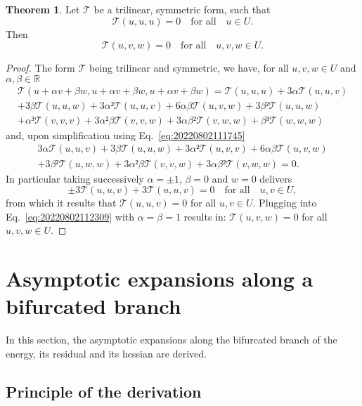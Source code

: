 \documentclass[12pt, final]{scrartcl}
\theoremstyle{definition}
\newtheorem{theorem}{Theorem}
\begin{document}
\begin{theorem}
  \label{thr:20220802112835}
  Let $𝒯$ be a trilinear, symmetric form, such that
  \begin{equation}
    \label{eq:20220802111745}
    𝒯(u, u, u) = 0 \quad \text{for all} \quad u \in U.
  \end{equation}
  Then
  \begin{equation}
    𝒯(u, v, w) = 0 \quad \text{for all} \quad u, v, w \in U.
  \end{equation}
\end{theorem}
\begin{proof}
  The form $𝒯$ being trilinear and symmetric, we have, for all $u, v, w \in U$
  and $α, β \in ℝ$
  \begin{multline*}
    𝒯(u + αv + βw, u + αv + βw, u + αv + βw) = 𝒯(u, u, u) + 3α 𝒯(u, u, v)\\
    + 3β 𝒯(u, u, w) + 3α² 𝒯(u, u, v) + 6 α β 𝒯(u, v, w) + 3 β² 𝒯(u, u, w)\\
    + α³ 𝒯(v, v, v) + 3 α² β 𝒯(v, v, w) + 3 α β² 𝒯(v, w, w) + β³ 𝒯(w, w, w)
  \end{multline*}
  and, upon simplification using Eq.~\eqref{eq:20220802111745}
  \begin{multline}
    \label{eq:20220802112309}
    3α 𝒯(u, u, v) + 3β 𝒯(u, u, w) + 3α² 𝒯(u, v, v) + 6 α β 𝒯(u, v, w)\\
    + 3 β² 𝒯(u, w, w) + 3 α² β 𝒯(v, v, w) + 3 α β² 𝒯(v, w, w) = 0.
  \end{multline}
  In particular taking successively $α = ±1$, $β = 0$ and $w = 0$ delivers
  \begin{equation*}
    ±3 𝒯(u, u, v) + 3 𝒯(u, u, v) = 0 \quad \text{for all} \quad u, v \in U,
  \end{equation*}
  from which it results that $𝒯(u, u, v) = 0$ for all $u, v \in U$. Plugging
  into Eq.~\eqref{eq:20220802112309} with $α = β = 1$ results in:
  $𝒯(u, v, w) = 0$ for all $u, v, w \in U$.
\end{proof}

\section{Asymptotic expansions along a bifurcated branch}
\label{sec:20220905060440}

In this section, the asymptotic expansions along the bifurcated branch of the
energy, its residual and its hessian are derived.

\subsection{Principle of the derivation}
\label{sec:20220107121442}
%
\end{document}
